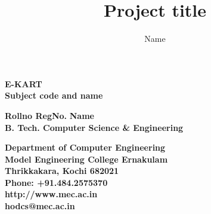 \documentclass[11pt]{report}
\begin{document}
\renewcommand\bibname{References}
\pagestyle{fancy}
\fancyfoot{}
\fancyfoot[c]{\thepage}
\renewcommand{\chaptermark}[1]{
\markboth{\thechapter.\ #1}{}} 
\renewcommand{\headrulewidth}{0.1pt}
\fancyhead[r]{\slshape \leftmark}
\addtolength{\headheight}{\baselineskip}

\lhead{\nouppercase{\rightmark}}
\rhead{\nouppercase{\leftmark}}
%
\title {Project title}
\author {Name}

\begin{titlepage}
\begin{center}

\Huge{\textbf{E-KART}}\\
\large{\textbf{Subject  code and name\\}}
\vspace{1.2in}

\Large{\textbf{Rollno
RegNo.
}}	\hspace{.1in}	\Large{\textbf{Name}}\\ 

\Large{\textbf{
B. Tech. Computer Science \& Engineering
}}


\vspace{.6in}
\begin{figure}[h]
\begin{center}
\end{center}
\end{figure}
\textbf{
Department of Computer Engineering\\
Model Engineering College Ernakulam\\
Thrikkakara, Kochi 682021\\
Phone: +91.484.2575370\\
http://www.mec.ac.in \\
hodcs@mec.ac.in
}
\end{center}
\end{titlepage}
\end{document}

